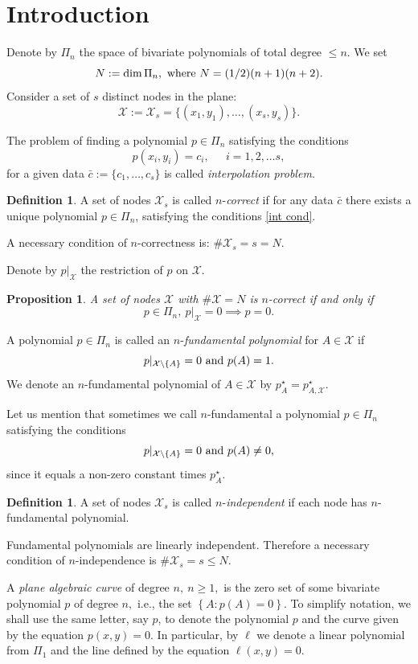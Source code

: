 \documentclass[a4paper,12pt]{article}
\newtheorem{proposition}[lemma]{Proposition}
\theoremstyle{definition}
\newtheorem{definition}[lemma]{Definition}
\numberwithin{equation}{section}
\numberwithin{figure}{section}
\newcommand{\Xset}{\mathcal{X}}
\begin{document}
\section{Introduction}
Denote by $\Pi_n$ the space of bivariate polynomials of total degree
$\le n.$ We set
$$
N:=\dim \Pi_n,\ \hbox{where}\ N=(1/2){(n+1)(n+2)}.
$$
\noindent Consider a set of $s$ distinct nodes in the plane:
$$\Xset:=\Xset_s=\{ (x_1, y_1), \dots , (x_s, y_s)\}.$$

The problem of finding a polynomial $p \in \Pi_n$ satisfying the conditions
\begin{equation}\label{int cond}
p(x_i, y_i) = c_i, \ \ \quad i = 1, 2, \dots s  ,
\end{equation}
for a given data $\bar c:=\{c_1, \dots, c_s\}$ is called \emph{interpolation problem.}
\begin{definition}
A set of nodes $\Xset_s$ is called
$n$-\emph{correct} if for any data $\bar c$ there exists a
unique polynomial $p \in \Pi_n$, satisfying the conditions
\eqref{int cond}.
\end{definition}
A necessary condition of
$n$-correctness is: $\#\Xset_s=s = N.$

Denote by $p|_\Xset$ the restriction of $p$ on $\Xset.$
\begin{proposition} \label{correctii}
A set of nodes $\Xset$ with $\#\Xset=N$ is $n$-correct if and only if
$$p \in \Pi_n,\ p|_\Xset=0\implies p = 0.$$
\end{proposition}
A polynomial $p \in \Pi_n$ is called an $n$-\emph{fundamental polynomial}
for $ A \in \Xset$ if
$$ p|_{\Xset\setminus\{A\}}=0\ \hbox{and}\ p(A)=1.$$
We denote an
$n$-fundamental polynomial of $A \in\Xset$ by $p_A^\star=p_{A,\Xset}^\star.$

Let us mention that sometimes we call $n$-fundamental a polynomial $p\in \Pi_n$ satisfying the conditions
$$ p|_{\Xset\setminus\{A\}}= 0\ \hbox{and}\ p(A)\neq 0,$$
since it equals a non-zero constant times $p_A^\star.$

\begin{definition}
A set of nodes $\Xset_s$ is called $n$-\emph{independent} if each node
has $n$-fundamental polynomial. 
\end{definition}
Fundamental polynomials are linearly independent. Therefore a
necessary condition of $n$-independence is $\#\Xset_s=s \le N.$


A \emph{plane algebraic curve} of degree $n,\ n\ge 1,$ is the zero set of some bivariate polynomial $p$ of degree $n,$ i.e., the set $\left\{A : p(A)=0\right\}.$ To simplify notation, we shall use the same letter,  say $p$,
to denote the polynomial $p$ and the curve given by the equation $p(x,y)=0$.
In particular, by $\ell$ we denote a linear
polynomial from $\Pi_1$ and the line defined by the equation
$\ell(x, y)=0.$
\end{document}
